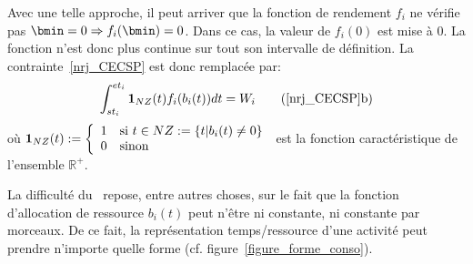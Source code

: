 Avec une telle approche, il peut arriver que la fonction de rendement
$f_i$ ne vérifie pas $\bmin=0 \Rightarrow f_i(\bmin)=0$. Dans ce cas,
la valeur de $f_i(0)$ est mise à $0$. La fonction n'est donc plus
continue sur tout son intervalle de définition. La
contrainte~\eqref{nrj_CECSP} est donc remplacée par:
\begin{equation}
  \int_{st_i}^{et_i}{\bf 1}_{NZ}(t)f_i(b_i(t))dt = W_i \tag{\ref{nrj_CECSP}b}
\end{equation}
\noindent 
où ${\bf 1}_{NZ}(t):=\left\{
  \begin{array}{ll}
    1 & \text{si }t \in NZ:=\{t|b_i(t)\neq0\}\\
    0 & \text{sinon}
  \end{array}
\right.$ est la fonction caractéristique de l'ensemble $\mathbb{R}^+$.

La difficulté du \CECSP~repose, entre autres choses, sur le fait que la
fonction d'allocation de ressource $b_i(t)$ peut n'être ni constante, ni
constante par morceaux. De ce fait, la représentation temps/ressource
d'une activité peut prendre n'importe quelle forme
(cf. figure~\ref{figure_forme_conso}). 

